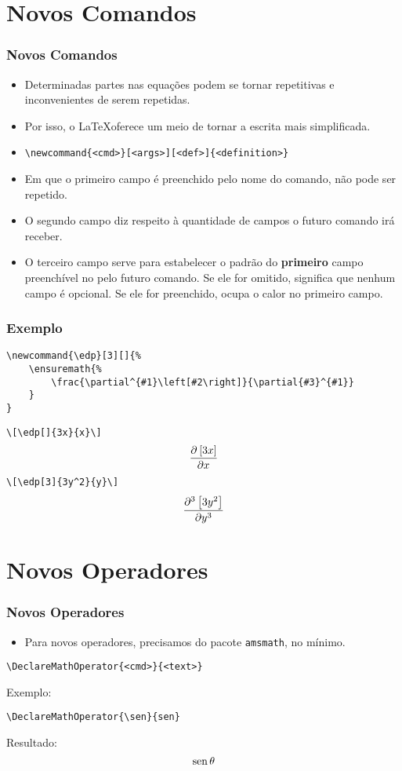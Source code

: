 \documentclass[brazilian]{beamer}
\begin{document}
\section{Novos Comandos}
\begin{frame}[fragile]
    \frametitle{Novos Comandos}

    \begin{itemize}
        \item Determinadas partes nas equações podem se tornar repetitivas e inconvenientes de serem repetidas. 
        \item Por isso, o \LaTeX oferece um meio de tornar a escrita mais simplificada.
        \item \lstinline[style=myStyleLatex]!\newcommand{<cmd>}[<args>][<def>]{<definition>}!
        \item Em que o primeiro campo é preenchido pelo nome do comando, não pode ser repetido.
        \item O segundo campo diz respeito à quantidade de campos o futuro comando irá receber. 
        \item O terceiro campo serve para estabelecer o padrão do \textbf{primeiro} campo preenchível no pelo futuro comando. Se ele for omitido, significa que nenhum campo é opcional. Se ele for preenchido, ocupa o calor no primeiro campo. 
    \end{itemize}

\end{frame}
\begin{frame}[fragile]
    \frametitle{Exemplo}
\footnotesize
\begin{lstlisting}[style=myStyleLatex]
\newcommand{\edp}[3][]{%
    \ensuremath{%
        \frac{\partial^{#1}\left[#2\right]}{\partial{#3}^{#1}}
    }
}
\end{lstlisting}
\lstinline[style=myStyleLatex]!\[\edp[]{3x}{x}\]!
\[\edp[]{3x}{x}\]
\lstinline[style=myStyleLatex]!\[\edp[3]{3y^2}{y}\]!
\[\edp[3]{3y^2}{y}\]

\end{frame}


\section{Novos Operadores}
\begin{frame}[fragile]
    \frametitle{Novos Operadores}

    \begin{itemize}
        \item Para novos operadores, precisamos do pacote \texttt{amsmath}, no mínimo.
    \end{itemize}
\begin{lstlisting}[style=myStyleLatex]
\DeclareMathOperator{<cmd>}{<text>}
\end{lstlisting}

Exemplo: 
\begin{lstlisting}[style=myStyleLatex]
\DeclareMathOperator{\sen}{sen}
\end{lstlisting}

Resultado: \[\sen\theta\]


\end{frame}
\end{document}
